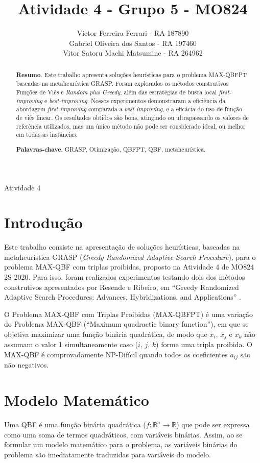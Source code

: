 \documentclass{MO824}
\title{Atividade 4 - Grupo 5 - MO824}
\author{
    Victor Ferreira Ferrari      - RA 187890\\
    Gabriel Oliveira dos Santos  - RA 197460\\
    Vitor Satoru Machi Matsumine - RA 264962
}
\newcommand{\B}{\mathbb{B}}
\newcommand{\R}{\mathbb{R}}
\begin{document}
\criartitulo

%
{Atividade 4}

\begin{abstract}
{\bf Resumo}. Este trabalho apresenta soluções heurísticas para o problema MAX-QBFPT baseadas na metaheurística GRASP. Foram explorados os métodos construtivos Funções de Viés e \textit{Random plus Greedy}, além das estratégias de busca local \textit{first-improving} e \textit{best-improving}. Nossos experimentos demonstraram a eficiência da abordagem \textit{first-improving} comparada a \textit{best-improving}, e a eficácia do uso de função de viés linear. Os resultados obtidos são bons, atingindo ou ultrapassando os valores de referência utilizados, mas um único método não pode ser considerado ideal, ou melhor em todas as instâncias.

{\bf Palavras-chave}. GRASP, Otimização, QBFPT, QBF, metaheurística.

\end{abstract}

\section{Introdução}

    Este trabalho consiste na apresentação de soluções heurísticas, baseadas na metaheurística GRASP (\textit{Greedy Randomized Adaptive Search Procedure}), para o problema MAX-QBF com triplas proibidas, proposto na Atividade 4 de MO824 2S-2020. Para isso, foram realizados experimentos testando dois dos métodos construtivos apresentados por Resende e Ribeiro, em ``Greedy Randomized Adaptive Search Procedures: Advances, Hybridizations, and Applications'' \cite{grasp}.
    
    O Problema MAX-QBF com Triplas Proibidas (MAX-QBFPT) é uma variação do Problema  MAX-QBF (``Maximum quadractic binary function''), em que se objetiva maximizar uma função binária quadrática, de modo que $x_i$, $x_j$ e $x_k$ não assumam o valor 1 simultaneamente caso ($i$, $j$, $k$) forme uma tripla proibida. O MAX-QBF é comprovadamente NP-Difícil \cite{kochenberger2014unconstrained} quando todos os coeficientes $a_{ij}$ são não negativos.
    
\section{Modelo Matemático}
    Uma QBF é uma função binária quadrática ($f:\B^n \rightarrow \R$) que pode ser expressa como uma soma de termos quadráticos, com variáveis binárias. Assim, ao se formular um modelo matemático para o problema, as variáveis binárias do problema são imediatamente traduzidas para variáveis do modelo.
 
\end{document}
